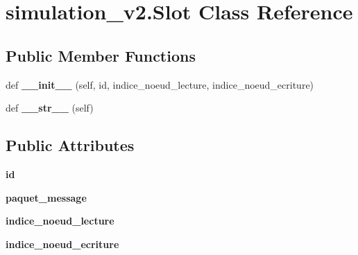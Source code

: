 \hypertarget{classsimulation__v2_1_1Slot}{}\section{simulation\+\_\+v2.\+Slot Class Reference}
\label{classsimulation__v2_1_1Slot}
\subsection*{Public Member Functions}
\begin{DoxyCompactItemize}
\item 
def {\bfseries \+\_\+\+\_\+init\+\_\+\+\_\+} (self, id, indice\+\_\+noeud\+\_\+lecture, indice\+\_\+noeud\+\_\+ecriture)\hypertarget{classsimulation__v2_1_1Slot_a31270a3b31e2536435b9b247f0888dea}{}\label{classsimulation__v2_1_1Slot_a31270a3b31e2536435b9b247f0888dea}

\item 
def {\bfseries \+\_\+\+\_\+str\+\_\+\+\_\+} (self)\hypertarget{classsimulation__v2_1_1Slot_a9efb27289d81250c819805f660d68ff4}{}\label{classsimulation__v2_1_1Slot_a9efb27289d81250c819805f660d68ff4}

\end{DoxyCompactItemize}
\subsection*{Public Attributes}
\begin{DoxyCompactItemize}
\item 
{\bfseries id}\hypertarget{classsimulation__v2_1_1Slot_a96310cfd1daa82093c81cb384313d49f}{}\label{classsimulation__v2_1_1Slot_a96310cfd1daa82093c81cb384313d49f}

\item 
{\bfseries paquet\+\_\+message}\hypertarget{classsimulation__v2_1_1Slot_a67f1a9377957b989a03d35c0dfe26e0b}{}\label{classsimulation__v2_1_1Slot_a67f1a9377957b989a03d35c0dfe26e0b}

\item 
{\bfseries indice\+\_\+noeud\+\_\+lecture}\hypertarget{classsimulation__v2_1_1Slot_aeaa12071d9fac7c64973a33a207c0f3b}{}\label{classsimulation__v2_1_1Slot_aeaa12071d9fac7c64973a33a207c0f3b}

\item 
{\bfseries indice\+\_\+noeud\+\_\+ecriture}\hypertarget{classsimulation__v2_1_1Slot_ab8bb24759b6a0e0a53701558d91441bc}{}\label{classsimulation__v2_1_1Slot_ab8bb24759b6a0e0a53701558d91441bc}

\end{DoxyCompactItemize}


